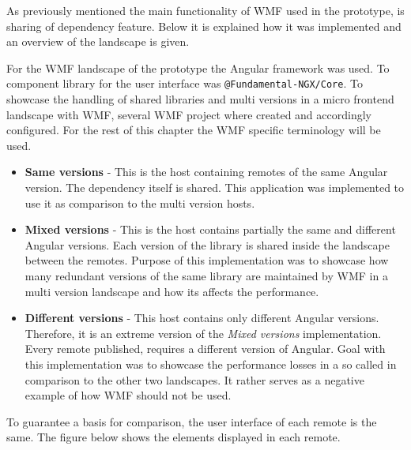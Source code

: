 As previously mentioned the main functionality of WMF used in the prototype, is sharing of dependency feature. Below it is explained how it was implemented and an overview of the landscape is given.

For the WMF landscape of the prototype the Angular framework was used. To component library for the user interface was \texttt{@Fundamental-NGX/Core}. To showcase the handling of shared libraries and multi versions in a micro frontend landscape with WMF, several WMF project where created and accordingly configured.
For the rest of this chapter the WMF specific terminology will be used.

\begin{itemize}
	\item \textbf{Same versions} - This is the host containing remotes of the same Angular version. The dependency itself is shared. This application was implemented to use it as comparison to the multi version hosts.
	
	\item \textbf{Mixed versions} - This is the host contains partially the same and different Angular versions. Each version of the library is shared inside the landscape between the remotes. Purpose of this implementation was to showcase how many redundant versions of the same library are maintained by WMF in a multi version landscape and how its affects the performance.
	
	\item \textbf{Different versions} - This host contains only different Angular versions. Therefore, it is an extreme version of the \textit{Mixed versions} implementation. Every remote published, requires a different version of Angular. Goal with this implementation was to showcase the performance losses in a so called in comparison to the other two landscapes. It rather serves as a negative example of how WMF should not be used.
\end{itemize}

To guarantee a basis for comparison, the user interface of each remote is the same. The figure below shows the elements displayed in each remote.

